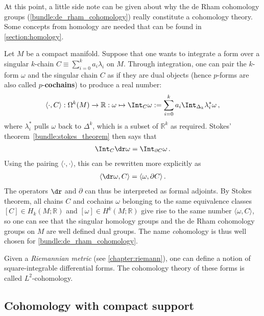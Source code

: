     At this point, a little side note can be given about why the de Rham cohomology groups (\cref{bundle:de_rham_cohomology}) really constitute a cohomology theory. Some concepts from homology are needed that can be found in \cref{section:homology}.

    Let $M$ be a compact manifold. Suppose that one wants to integrate a form over a singular $k$-chain $C\equiv\sum_{i=0}^ka_i\lambda_i$ on $M$. Through integration, one can pair the $k$-form $\omega$ and the singular chain $C$ as if they are dual objects (hence $p$-forms are also called $p$-\textbf{cochains}) to produce a real number:
    \begin{gather}
        \langle\cdot,C\rangle:\Omega^k(M)\rightarrow\mathbb{R}:\omega\mapsto\Int_C\omega := \sum_{i=0}^ka_i\Int_{\Delta_k}\lambda_i^*\omega\,,
    \end{gather}
    where $\lambda_i^*$ pulls $\omega$ back to $\Delta^k$, which is a subset of $\mathbb{R}^k$ as required. Stokes' theorem~\ref{bundle:stokes_theorem} then says that
    \begin{gather}
        \Int_C\dr\omega = \Int_{\partial C}\omega\,.
    \end{gather}
    Using the pairing $\langle\cdot,\cdot\rangle$, this can be rewritten more explicitly as
    \begin{gather}
        \langle\dr\omega,C \rangle = \langle\omega,\partial C\rangle\,.
    \end{gather}
    The operators $\dr$ and $\partial$ can thus be interpreted as formal adjoints. By Stokes theorem, all chains $C$ and cochains $\omega$ belonging to the same equivalence classes $[C]\in H_k(M;\mathbb{R})$ and $[\omega]\in H^k(M;\mathbb{R})$ give rise to the same number $\langle\omega,C\rangle$, so one can see that the singular homology groups and the de Rham cohomology groups on $M$ are well defined dual groups. The name \textit{co}homology is thus well chosen for \cref{bundle:de_rham_cohomology}.

    \begin{remark}[$L^2$-cohomology]
        Given a \textit{Riemannian metric} (see \cref{chapter:riemann}), one can define a notion of square-integrable differential forms. The cohomology theory of these forms is called $L^2$-cohomology.
    \end{remark}

\subsection{Cohomology with compact support}\label{section:compact_cohomology}

